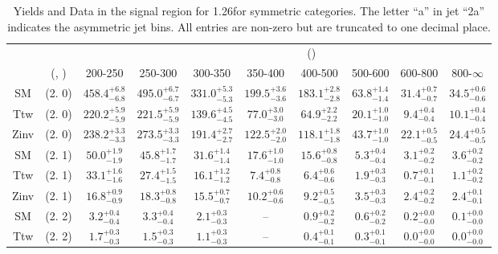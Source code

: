 \begin{table}[h!]
\tiny
\centering
\caption{Yields and Data in the signal region for 1.26\ifb for symmetric categories. The letter ``a'' in jet \eg ``2a''  indicates the asymmetric jet bins. All entries are non-zero but are truncated to one decimal place.\label{tab:yieldsnodata_sig_comb_sym}}
\begin{tabular}
{cccccccccc}
	\hline\hline
&	&	& \multicolumn{8}{c}{\scalht (\gev)}\\ 
	&	 (\njet, \nb) & 200-250 & 250-300 & 300-350 & 350-400 & 400-500 & 500-600 & 600-800 & 800-$\infty$ \\ [0.8ex] 
\hline
	SM & (2. 0) & $458.4^{+ 6.8 }_{- 6.8 }$ & $495.0^{+ 6.7 }_{- 6.7 }$ & $331.0^{+ 5.3 }_{- 5.3 }$ & $199.5^{+ 3.6 }_{- 3.6 }$ & $183.1^{+ 2.8 }_{- 2.8 }$ & $63.8^{+ 1.4 }_{- 1.4 }$ & $31.4^{+ 0.7 }_{- 0.7 }$ & $34.5^{+ 0.6 }_{- 0.6 }$ \\[0.5ex] 
	Ttw & (2. 0) & $220.2^{+ 5.9 }_{- 5.9 }$ & $221.5^{+ 5.9 }_{- 5.9 }$ & $139.6^{+ 4.5 }_{- 4.5 }$ & $77.0^{+ 3.0 }_{- 3.0 }$ & $64.9^{+ 2.2 }_{- 2.2 }$ & $20.1^{+ 1.0 }_{- 1.0 }$ & $9.4^{+ 0.4 }_{- 0.4 }$ & $10.1^{+ 0.4 }_{- 0.4 }$ \\[0.5ex] 
	Zinv & (2. 0) & $238.2^{+ 3.3 }_{- 3.3 }$ & $273.5^{+ 3.3 }_{- 3.3 }$ & $191.4^{+ 2.7 }_{- 2.7 }$ & $122.5^{+ 2.0 }_{- 2.0 }$ & $118.1^{+ 1.8 }_{- 1.8 }$ & $43.7^{+ 1.0 }_{- 1.0 }$ & $22.1^{+ 0.5 }_{- 0.5 }$ & $24.4^{+ 0.5 }_{- 0.5 }$ \\[0.5ex] 
	SM & (2. 1) & $50.0^{+ 1.9 }_{- 1.9 }$ & $45.8^{+ 1.7 }_{- 1.7 }$ & $31.6^{+ 1.4 }_{- 1.4 }$ & $17.6^{+ 1.0 }_{- 1.0 }$ & $15.6^{+ 0.8 }_{- 0.8 }$ & $5.3^{+ 0.4 }_{- 0.4 }$ & $3.1^{+ 0.2 }_{- 0.2 }$ & $3.6^{+ 0.2 }_{- 0.2 }$ \\[0.5ex] 
	Ttw & (2. 1) & $33.1^{+ 1.6 }_{- 1.6 }$ & $27.4^{+ 1.5 }_{- 1.5 }$ & $16.1^{+ 1.2 }_{- 1.2 }$ & $7.4^{+ 0.8 }_{- 0.8 }$ & $6.4^{+ 0.6 }_{- 0.6 }$ & $1.9^{+ 0.3 }_{- 0.3 }$ & $0.7^{+ 0.1 }_{- 0.1 }$ & $1.1^{+ 0.2 }_{- 0.2 }$ \\[0.5ex] 
	Zinv & (2. 1) & $16.8^{+ 0.9 }_{- 0.9 }$ & $18.3^{+ 0.8 }_{- 0.8 }$ & $15.5^{+ 0.7 }_{- 0.7 }$ & $10.2^{+ 0.6 }_{- 0.6 }$ & $9.2^{+ 0.5 }_{- 0.5 }$ & $3.5^{+ 0.3 }_{- 0.3 }$ & $2.4^{+ 0.2 }_{- 0.2 }$ & $2.4^{+ 0.1 }_{- 0.1 }$ \\[0.5ex] 
	SM & (2. 2) & $3.2^{+ 0.4 }_{- 0.4 }$ & $3.3^{+ 0.4 }_{- 0.4 }$ & $2.1^{+ 0.3 }_{- 0.3 }$ & -- & $0.9^{+ 0.2 }_{- 0.2 }$ & $0.6^{+ 0.2 }_{- 0.2 }$ & $0.2^{+ 0.0 }_{- 0.0 }$ & $0.1^{+ 0.0 }_{- 0.0 }$ \\[0.5ex] 
	Ttw & (2. 2) & $1.7^{+ 0.3 }_{- 0.3 }$ & $1.5^{+ 0.3 }_{- 0.3 }$ & $1.1^{+ 0.3 }_{- 0.3 }$ & -- & $0.4^{+ 0.1 }_{- 0.1 }$ & $0.3^{+ 0.1 }_{- 0.1 }$ & $0.0^{+ 0.0 }_{- 0.0 }$ & $0.0^{+ 0.0 }_{- 0.0 }$ \\[0.5ex] 

\end{tabular}
\end{table}
